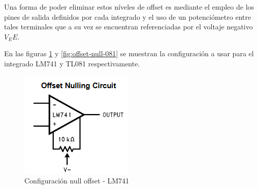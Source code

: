 \documentclass[conference]{IEEEtran}
\begin{document}
	Una forma de poder eliminar estos níveles de offset es mediante el empleo de los pines de salida definidos por cada integrado y el uso de un potenciómetro entre tales terminales que a su vez se encuentran referenciadas por el voltaje negativo $V_EE$.
	
	En las figuras \ref{fig:offset-null-741} y \ref{fig:offset-null-081} se muestran la configuración a usar para el integrado LM741 y TL081 respectivamente.
	
	\begin{figure}[h]
		\centering
		\begin{minipage}{0.4\linewidth}
			\centering
			\includegraphics[width=\linewidth]{media/offset-null-741}
			\caption{Configuración null offset - LM741}
			\label{fig:offset-null-741}
		\end{minipage}
		\hfill
		\begin{minipage}{0.4\linewidth}
			\centering

\end{minipage}
\end{figure}
\end{document}
